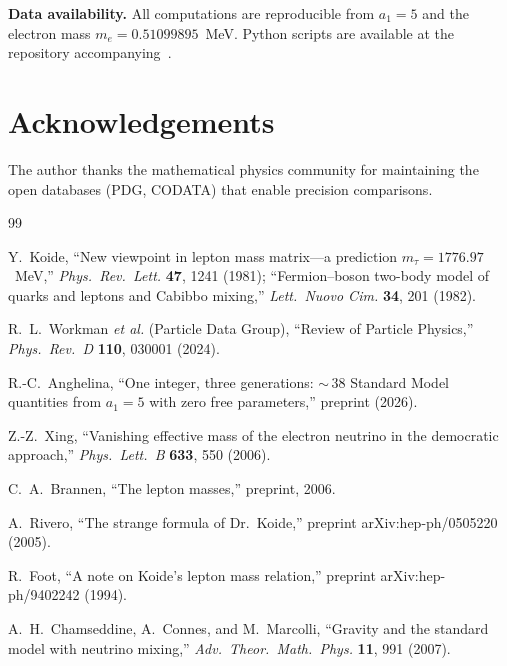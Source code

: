 \documentclass[12pt,a4paper]{article}
\theoremstyle{definition}
\begin{document}
\bigskip

\noindent\textbf{Data availability.}  All computations are reproducible from $a_1 = 5$ and the electron mass $m_e = 0.51099895$~MeV.  Python scripts are available at the repository accompanying~\cite{Anghelina2026}.

\section*{Acknowledgements}

The author thanks the mathematical physics community for maintaining the open databases (PDG, CODATA) that enable precision comparisons.

\begin{thebibliography}{99}

Y.~Koide, ``New viewpoint in lepton mass matrix---a prediction $m_\tau = 1776.97$~MeV,'' \textit{Phys.\ Rev.\ Lett.} \textbf{47}, 1241 (1981); ``Fermion--boson two-body model of quarks and leptons and Cabibbo mixing,'' \textit{Lett.\ Nuovo Cim.} \textbf{34}, 201 (1982).

R.~L.~Workman \textit{et al.} (Particle Data Group), ``Review of Particle Physics,'' \textit{Phys.\ Rev.\ D} \textbf{110}, 030001 (2024).

R.-C.~Anghelina, ``One integer, three generations: ${\sim}\,38$ Standard Model quantities from $a_1 = 5$ with zero free parameters,'' preprint (2026).

Z.-Z.~Xing, ``Vanishing effective mass of the electron neutrino in the democratic approach,'' \textit{Phys.\ Lett.\ B} \textbf{633}, 550 (2006).

C.~A.~Brannen, ``The lepton masses,'' preprint, 2006.

A.~Rivero, ``The strange formula of Dr.\ Koide,'' preprint arXiv:hep-ph/0505220 (2005).

R.~Foot, ``A note on Koide's lepton mass relation,'' preprint arXiv:hep-ph/9402242 (1994).

A.~H.~Chamseddine, A.~Connes, and M.~Marcolli, ``Gravity and the standard model with neutrino mixing,'' \textit{Adv.\ Theor.\ Math.\ Phys.} \textbf{11}, 991 (2007).

\end{thebibliography}
\end{document}
